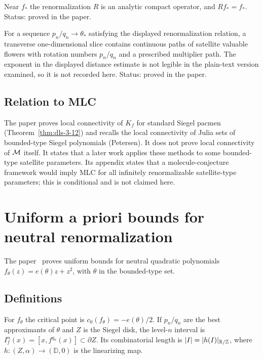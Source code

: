 \begin{theorem}
\label{thm:dls-3-16}
Near $f_*$ the renormalization $R$ is an analytic compact operator, and $Rf_*=f_*$.  Status:
proved in the paper.
\end{theorem}

\begin{theorem}
\label{thm:dls-8-2}
For a sequence $p_n/q_n\to\theta_*$ satisfying the displayed renormalization relation, a
transverse one-dimensional slice contains continuous paths of satellite valuable flowers with
rotation numbers $p_n/q_n$ and a prescribed multiplier path.  The exponent in the displayed
distance estimate is not legible in the plain-text version examined, so it is not recorded here.
Status: proved in the paper.
\end{theorem}

\subsection*{Relation to MLC}

The paper proves local connectivity of $K_f$ for standard Siegel pacmen
(Theorem~\ref{thm:dls-3-12}) and recalls the local connectivity of Julia sets of
bounded-type Siegel polynomials (Petersen).  It does not prove local connectivity of
$\mathcal M$ itself.  It states that a later work applies these methods to some bounded-type
satellite parameters.  Its appendix states that a molecule-conjecture framework would
imply MLC for all infinitely renormalizable satellite-type parameters; this is conditional
and is not claimed here.

\section{Uniform a priori bounds for neutral renormalization}
\label{sec:digest-neutral-apriori}

The paper~\cite{DudkoLyubichNeutral} proves uniform bounds for neutral quadratic polynomials
$f_\theta(z)=e(\theta)z+z^2$, with $\theta$ in the bounded-type set.

\subsection*{Definitions}

\begin{definition}
\label{def:neutral-critical}
For $f_\theta$ the critical point is $c_0(f_\theta)=-e(\theta)/2$.  If $p_n/q_n$ are the best
approximants of $\theta$ and $Z$ is the Siegel disk, the level-$n$ interval is
$I^n_f(x)=[x,f^{q_n}(x)]\subset\partial Z$.  Its combinatorial length is $|I|=|h(I)|_{\mathbb R/\mathbb Z}$,
where $h\colon(Z,\alpha)\to(\mathbb D,0)$ is the linearizing map.
\end{definition}

